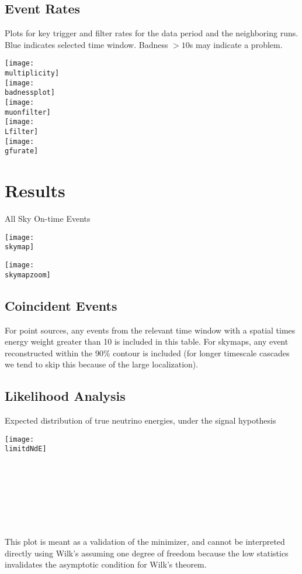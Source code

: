 \documentclass[titlepage]{article}
\begin{document}
\pagebreak
\subsection{Event Rates}
Plots for key trigger and filter rates for the data period
and the neighboring runs.  Blue indicates selected time window.
Badness $>10$s may indicate a problem.

\vspace{1em}
{
 \centering        
 \texttt{[image: \\multiplicity]}\\
 \texttt{[image: \\badnessplot]}\\
 \texttt{[image: \\muonfilter]}\\
 \texttt{[image: \\Lfilter]}\\
 \texttt{[image: \\gfurate]}
}

\pagebreak
\section{Results}

{
  \centering
  {\Large All Sky On-time Events}

  \texttt{[image: \\skymap]}

  \texttt{[image: \\skymapzoom]}
  
}
\pagebreak


\subsection{Coincident Events}
For point sources, any events from the relevant time window with a spatial times energy weight greater than 10 is included in this table. For skymaps, any event reconstructed within the 90\% contour is included (for longer timescale cascades we tend to skip this because of the large localization). 
\event

\subsection{Likelihood Analysis}
\results

\pagebreak
{
  \centering

  {\large Expected distribution of true neutrino energies, under the signal hypothesis }

  \texttt{[image: \\limitdNdE]}
  \\
  \\

  \tsd

  \\
  \\
  \upperlim

  \\
  \\
  \nsscan

  This plot is meant as a validation of the minimizer, and cannot be interpreted directly using Wilk's assuming one degree of freedom because the low statistics invalidates the asymptotic condition for Wilk's theorem.  
}

\vfill
\end{document}
